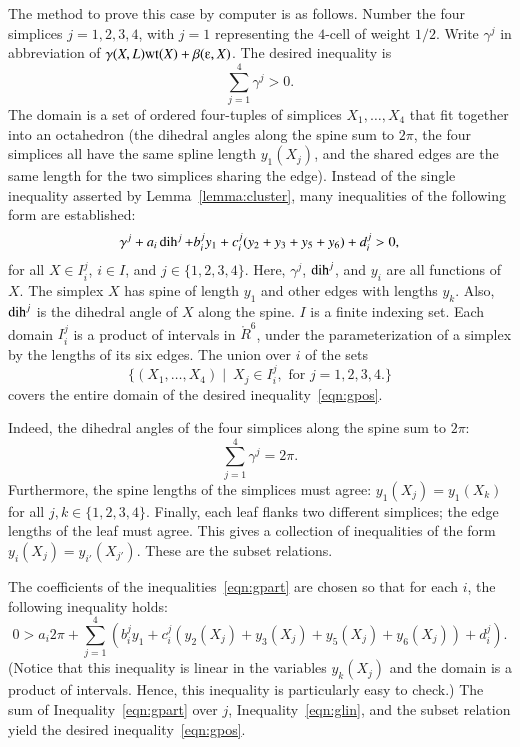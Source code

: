 The method to prove this case by computer is as follows.  Number the
four simplices $j=1,2,3,4$, with $j=1$ representing the $4$-cell of
weight $1/2$.  Write $\gamma^j$ in abbreviation of
$\gamma(X,L)\op{wt}(X) + \beta(\ee,X)$.  The desired inequality is
\begin{equation}\label{eqn:gpos} 
\sum_{j=1}^4 \gamma^j > 0.
\end{equation}
The domain is a set of ordered four-tuples of simplices
$X_1,\ldots,X_4$ that fit together into an octahedron (the dihedral
angles along the spine sum to $2\pi$, the four simplices all have the
same spline length $y_1(X_j)$, and the shared edges are the same
length for the two simplices sharing the edge).  Instead of the single
inequality asserted by Lemma~\ref{lemma:cluster}, many inequalities of
the following form are established:
\begin{equation}\label{eqn:gpart} 
\gamma^j + a_i \operatorname{dih}^j + b_i^j y_1 + c_i^j (y_2+y_3+y_5+y_6) + d_i^j > 0, 
\end{equation}
for all $X \in I_i^j$, \quad $i \in I$, and $j\in \{1,2,3,4\}$.  Here,
$\gamma^j$, $\operatorname{dih}^j$, and $y_i$ are all functions of $X$.  The simplex
$X$ has spine of length $y_1$ and other edges with lengths $y_k$.
Also, $\operatorname{dih}^j$ is the dihedral angle of $X$ along the spine.  $I$ is a
finite indexing set.  Each domain $I_i^j$ is a product of intervals in
$\ring{R}^6$, under the parameterization of a simplex by the lengths
of its six edges.  The union over $i$ of the sets
\[  
\{(X_1,\ldots,X_4)\mid~ X_j \in I_i^j,\text{ for } j=1,2,3,4.\}
\] 
covers the entire domain of the desired inequality~\eqref{eqn:gpos}.   

  Indeed, the
dihedral angles of the four simplices along the spine sum to $2\pi$:
\[  
\sum_{j=1}^4 \gamma^j = 2\pi.
\] 
Furthermore, the spine lengths of the simplices must agree: $y_1(X_j)
= y_1(X_k)$ for all $j,k\in\{1,2,3,4\}$.  Finally, each leaf flanks
two different simplices; the edge lengths of the leaf must agree.
This gives a collection of inequalities of the form $y_i(X_j) =
y_{i'}(X_{j'})$.  These are the subset relations.

The coefficients of the inequalities~\eqref{eqn:gpart}
are chosen so that for each $i$, the following inequality holds:
\begin{equation}\label{eqn:glin} 
0 > a_i 2\pi + 
\sum_{j=1}^4 (b_i^j y_1 +  c_i^j (y_2(X_j)+y_3(X_j)+y_5(X_j)+y_6(X_j)) + d_i^j).
\end{equation}
(Notice that this inequality is linear in the variables $y_k(X_j)$ and
the domain is a product of intervals.  Hence, this inequality is
particularly easy to check.)  The sum of Inequality~\eqref{eqn:gpart} over $j$, Inequality~\ref{eqn:glin},
and the subset relation yield the desired inequality~\ref{eqn:gpos}.

